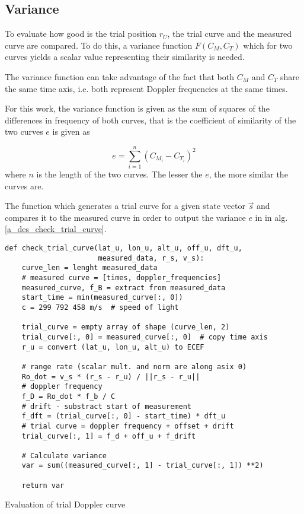 \subsection{Variance}
To evaluate how good is the trial position $r_U$, the trial curve and the measured curve are compared. To do this, a variance function $F(C_M, C_T)$ which for two curves yields a scalar value representing their similarity is needed.

The variance function can take advantage of the fact that both $C_M$ and $C_T$ share the same time axis, i.e. both represent Doppler frequencies at the same times.

For this work, the variance function is given as the sum of squares of the differences in frequency of both curves, that is the coefficient of similarity of the two curves $e$ is given as

\begin{equation}
    e = \sum_{i=1}^n (C_{M_i} - C_{T_i})^2
\end{equation}
where $n$ is the length of the two curves. The lesser the $e$, the more similar the curves are.

The function which generates a trial curve for a given state vector $\Vec{s}$ and compares it to the measured curve in order to output the variance $e$ in in alg. \ref{a_des_check_trial_curve}.

\begin{algorithm}
    \centering
    \begin{verbatim}
def check_trial_curve(lat_u, lon_u, alt_u, off_u, dft_u, 
                      measured_data, r_s, v_s):                      
    curve_len = lenght measured_data
    # measured curve = [times, doppler_frequencies]
    measured_curve, f_B = extract from measured_data
    start_time = min(measured_curve[:, 0])
    c = 299 792 458 m/s  # speed of light
    
    trial_curve = empty array of shape (curve_len, 2)
    trial_curve[:, 0] = measured_curve[:, 0]  # copy time axis
    r_u = convert (lat_u, lon_u, alt_u) to ECEF

    # range rate (scalar mult. and norm are along asix 0)
    Ro_dot = v_s * (r_s - r_u) / ||r_s - r_u|| 
    # doppler frequency 
    f_D = Ro_dot * f_b / C  
    # drift - substract start of measurement
    f_dft = (trial_curve[:, 0] - start_time) * dft_u
    # trial curve = doppler frequency + offset + drift
    trial_curve[:, 1] = f_d + off_u + f_drift

    # Calculate variance
    var = sum((measured_curve[:, 1] - trial_curve[:, 1]) **2)
    
    return var
    \end{verbatim}
    \caption{Evaluation of trial Doppler curve}
    \label{a_des_check_trial_curve}
\end{algorithm}



